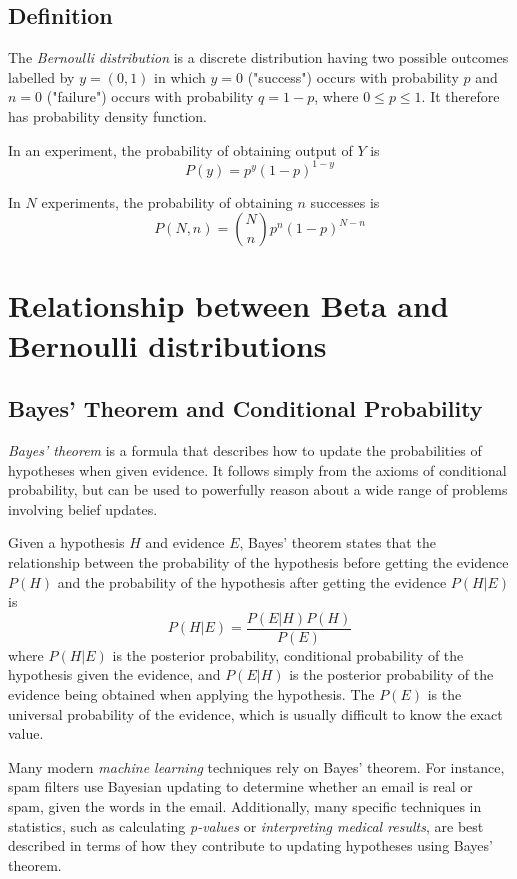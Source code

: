 \documentclass[a4paper]{article}
\begin{document}
\subsection{Definition}
The \emph{Bernoulli distribution} is a discrete distribution having two possible outcomes labelled by $y=(0, 1)$ in which $y=0$ ("success") occurs with probability $p$ and $n=0$ ("failure") occurs with probability $q=1-p$, where $0 \leq p \leq 1$. It therefore has probability density function.

In an experiment, the probability of obtaining output of $Y$ is
\begin{equation}
    P(y) = p^y (1-p)^{1-y}
\end{equation}

In $N$ experiments, the probability of obtaining $n$ successes is
\begin{equation}
    P(N, n) = \binom{N}{n} p^n (1-p)^{N-n}
\end{equation}

\section{Relationship between Beta and Bernoulli distributions}

\subsection{Bayes' Theorem and Conditional Probability}
\emph{Bayes' theorem} is a formula that describes how to update the probabilities of hypotheses when given evidence. It follows simply from the axioms of conditional probability, but can be used to powerfully reason about a wide range of problems involving belief updates.

Given a hypothesis $H$ and evidence $E$, Bayes' theorem states that the relationship between the probability of the hypothesis before getting the evidence $P(H)$ and the probability of the hypothesis after getting the evidence $P(H|E)$ is
\begin{equation}
    P(H|E) = \frac{P(E|H) P(H)}{P(E)}
\end{equation}
where $P(H|E)$ is the posterior probability, conditional probability of the hypothesis given the evidence, and $P(E|H)$ is the posterior probability of the evidence being obtained when applying the hypothesis.
The $P(E)$ is the universal probability of the evidence, which is usually difficult to know the exact value.

Many modern \emph{machine learning} techniques rely on Bayes' theorem. For instance, spam filters use Bayesian updating to determine whether an email is real or spam, given the words in the email. Additionally, many specific techniques in statistics, such as calculating \emph{p-values} or \emph{interpreting medical results}, are best described in terms of how they contribute to updating hypotheses using Bayes' theorem.
\end{document}
